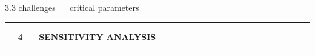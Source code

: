 \documentclass[11pt, compress, t, notes = noshow, xcolor = table, 
aspectratio = 1610]{beamer}
\newcommand{\highlight}[1]{\textcolor{highlightcol}{\textbf{#1}}}
\newcommand{\flexitem}[1]{\item[$\highlight{#1}$]}
\begin{document}
\begin{frame}{\textcolor{gray!90}{3.3 challenges} ~~ critical parameters}
\end{frame}


% 
% 


\LARGE
\begin{frame}{\phantom{foo}}
\normalsize
\vspace{-0.5cm}
\noindent \textcolor{gray!90}{\rule{\textwidth}{1pt}}
\smallskip

\Huge
\hspace{0pt}
\vfill
\textbf{\highlight{~~ 4 ~~ SENSITIVITY ANALYSIS}}
\vfill
\hspace{0pt}

\noindent \textcolor{gray!90}{\rule{\textwidth}{1pt}}

\end{frame}

\end{document}
